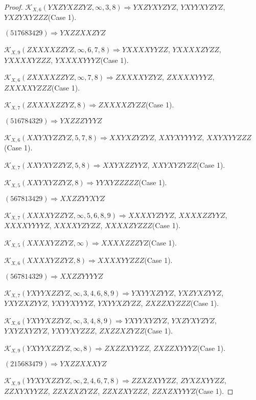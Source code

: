 \documentclass[12pt]{article}
\theoremstyle{plain}
\theoremstyle{definition}
\theoremstyle{remark}
\newcommand{\fancy}[1]{\mathcal{#1}}
\def\K{\fancy{K}}
\begin{document}
\begin{proof}
	$\K_{X,6}(YXZYXZZYZ,\infty,3, 8)\Rightarrow $$YXZYXYZYZ$, $YXYYXYZYZ$, $YXZYXYZZZ$(Case 1).
	
	
	
	$(5 1 7 6 8 3 4 2 9)\Rightarrow YXZZXXZYZ$
	
	
	
	$\K_{X,9}(ZXXXXZZYZ,\infty,6, 7, 8)\Rightarrow $$YXXXXYYZZ$, $YXXXXZYZZ$, $YXXXXYZZZ$, $YXXXXYYYZ$(Case 1).
	
	$\K_{X,6}(ZXXXXZZYZ,\infty,7, 8)\Rightarrow $$ZXXXXYZYZ$, $ZXXXXYYYZ$, $ZXXXXYZZZ$(Case 1).
	
	$\K_{X,7}(ZXXXXZZYZ,8)\Rightarrow $$ZXXXXZYZZ$(Case 1).
	
	
	
	$(5 1 6 7 8 4 3 2 9)\Rightarrow YXZZZYYYZ$
	
	
	
	$\K_{X,6}(XXYXYZZYZ,5, 7, 8)\Rightarrow $$XXYXZYZYZ$, $XXYXYYYYZ$, $XXYXYYZZZ$(Case 1).
	
	$\K_{X,7}(XXYXYZZYZ,5, 8)\Rightarrow $$XXYXZZYYZ$, $XXYXYZYZZ$(Case 1).
	
	$\K_{X,5}(XXYXYZZYZ,8)\Rightarrow $$YYXYZZZZZ$(Case 1).
	
	
	
	$(5 6 7 8 1 3 4 2 9)\Rightarrow XXZZYYXYZ$
	
	
	
	$\K_{X,7}(XXXXYZZYZ,\infty,5, 6, 8, 9)\Rightarrow $$XXXXYZYYZ$, $XXXXZZYYZ$, $XXXXYYYYZ$, $XXXXYZYZZ$, $XXXXZYZZZ$(Case 1).
	
	$\K_{X,5}(XXXXYZZYZ,\infty)\Rightarrow $$XXXXZZZYZ$(Case 1).
	
	$\K_{X,6}(XXXXYZZYZ,8)\Rightarrow $$XXXXYYZZZ$(Case 1).
	
	
	
	$(5 6 7 8 1 4 3 2 9)\Rightarrow XXZZYYYYZ$
	
	
	
	$\K_{X,7}(YXYYXZZYZ,\infty,3, 4, 6, 8, 9)\Rightarrow $$YXYYXZYYZ$, $YXZYXZYYZ$, $YXYZXZYYZ$, $YXYYXYYYZ$, $YXYYXZYZZ$, $ZXZZXYZZZ$(Case 1).
	
	$\K_{X,6}(YXYYXZZYZ,\infty,3, 4, 8, 9)\Rightarrow $$YXYYXYZYZ$, $YXZYXYZYZ$, $YXYZXYZYZ$, $YXYYXYZZZ$, $ZXZZXZYZZ$(Case 1).
	
	$\K_{X,9}(YXYYXZZYZ,\infty,8)\Rightarrow $$ZXZZXYYZZ$, $ZXZZXYYYZ$(Case 1).
	
	
	
	$(2 1 5 6 8 3 4 7 9)\Rightarrow YXZZXXXYZ$
	
	
	
	$\K_{X,9}(YYXYXZZYZ,\infty,2, 4, 6, 7, 8)\Rightarrow $$ZZXZXYYZZ$, $ZYXZXYYZZ$, $ZZXYXYYZZ$, $ZZXZXZYZZ$, $ZZXZXYZZZ$, $ZZXZXYYYZ$(Case 1).
	

\end{proof}
\end{document}
